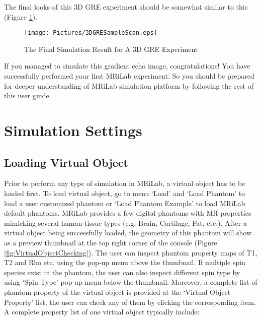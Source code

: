\documentclass{book}%
\begin{document}
The final looks of this 3D GRE experiment should be somewhat similar to this (Figure \ref{fig:3DGRESampleScan}).


\begin{figure}[htbp]
	\centering
		\texttt{[image: Pictures/3DGRESampleScan.eps]}
	\caption{The Final Simulation Result for A 3D GRE Experiment}
	\label{fig:3DGRESampleScan}
\end{figure}

If you managed to simulate this gradient echo image, congratulations! You have successfully performed your first MRiLab experiment. So you should be prepared for deeper understanding of MRiLab simulation platform by following the rest of this user guide.


\chapter{Simulation Settings}

\section{Loading Virtual Object}

Prior to perform any type of simulation in MRiLab, a virtual object has to be loaded first. To load virtual object, go to menu `Load' and `Load Phantom' to load a user customized phantom or `Load Phantom Example' to load MRiLab default phantoms. MRiLab provides a few digital phantoms with MR properties mimicking several human tissue types (e.g. Brain, Cartilage, Fat, etc.). After a virtual object being successfully loaded, the geometry of this phantom will show as a preview thumbnail at the top right corner of the console (Figure \ref{fig:VirtualObjectChecking}). The user can inspect phantom property maps of T1, T2 and Rho etc. using the pop-up menu above the thumbnail. If multiple spin species exist in the phantom, the user can also inspect different spin type by using `Spin Type' pop-up menu below the thumbnail. Moreover, a complete list of phantom property of the virtual object is provided at the `Virtual Object Property' list, the user can check any of them by clicking the corresponding item. A complete property list of one virtual object typically include:
\end{document}
